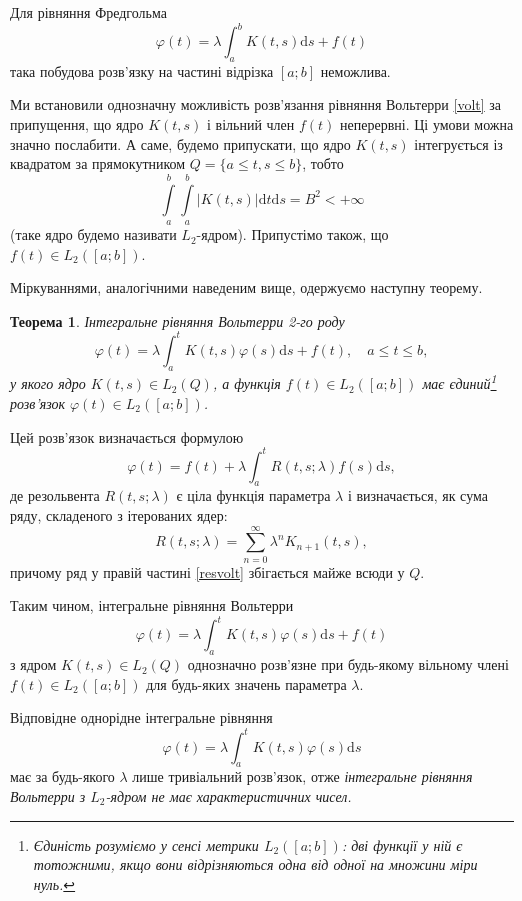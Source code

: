 \documentclass[14pt,twoside]{extreport}
\theoremstyle{mystyle}
\newtheorem{thm}{Теорема}
\numberwithin{equation}{chapter}
\begin{document}
Для рівняння Фредгольма
\[
\varphi(t) = \lambda \int_{a}^{b} K(t, s) \mathrm{d}s +f(t)
\]
така побудова розв'язку на частині відрізка $[a; b]$ неможлива.

Ми встановили однозначну можливість розв'язання рівняння Вольтерри \eqref{volt} за припущення, що ядро $K(t, s)$ і вільний член $f(t)$ неперервні. Ці умови можна значно послабити. А саме, будемо припускати, що ядро $K(t, s)$ інтегрується із квадратом за прямокутником $Q=\{a \leqslant t, s \leqslant b\}$, тобто
\begin{equation}
\int\limits_{a}^{b}\int\limits_{a}^{b}|K(t, s)| \mathrm{d}t \mathrm{d}s = B^2 < +\infty
\end{equation}
(таке ядро будемо називати $L_2$-ядром). Припустімо також, що $f(t) \in L_2([a; b])$.

Міркуваннями, аналогічними наведеним вище, одержуємо наступну теорему.

\begin{thm}
	Інтегральне рівняння Вольтерри 2-го роду
	\begin{equation}
	\varphi(t) = \lambda \int_{a}^{t} K(t, s) \varphi(s) \mathrm{d}s + f(t), \quad a\leqslant t \leqslant b,
	\end{equation}
	у якого ядро $K(t, s)\in L_2(Q)$, а функція $f(t) \in L_2([a; b])$ має єдиний\footnote{Єдиність розуміємо у сенсі метрики $L_2([a; b])$: дві функції у ній є тотожними, якщо вони відрізняються одна від одної на множини міри нуль.} розв'язок $\varphi(t) \in L_2([a; b])$.
\end{thm}

Цей розв'язок визначається формулою
\[
\varphi(t) = f(t) + \lambda \int_{a}^{t} R(t, s; \lambda) f(s) \mathrm{d}s,
\]
де резольвента $R(t, s; \lambda)$ є ціла функція параметра $\lambda$ і визначається, як сума ряду, складеного з ітерованих ядер:
\begin{equation}\label{resvolt}
R(t, s; \lambda) = \sum_{n=0}^{\infty} \lambda^n K_{n+1}(t,s),
\end{equation}
причому ряд у правій частині \eqref{resvolt} збігається майже всюди у $Q$.

Таким чином, інтегральне рівняння Вольтерри
\[
\varphi(t)=\lambda\int_{a}^{t} K(t,s) \varphi(s)\mathrm{d}s + f(t)
\]
з ядром $K(t, s) \in L_2(Q)$ однозначно розв'язне при будь-якому вільному члені $f(t) \in L_2([a; b])$ для будь-яких значень параметра $\lambda$.

Відповідне однорідне інтегральне рівняння
\[
\varphi(t)=\lambda\int_{a}^{t} K(t,s) \varphi(s)\mathrm{d}s
\]
має за будь-якого $\lambda$ лише тривіальний розв'язок, отже \emph{інтегральне рівняння Вольтерри з $L_2$-ядром не має характеристичних чисел.}
\end{document}
